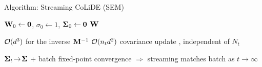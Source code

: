 \documentclass[9pt, aspectratio=169, xcolor=table]{beamer}
\begin{document}
\begin{frame}[shrink=15]{Algorithm: Streaming CoLiDE (SEM)}

	\begin{minipage}[t]{0.60\textwidth}
	{\small
	\begin{algorithm}[H]
	\DontPrintSemicolon
	\KwOut{$\widehat{\bbW}$}
	${\mathbf W}_0\gets{\ensuremath{\mathbf 0}}$, $\sigma_0\gets1$, $\boldsymbol{\Sigma}_0\gets{\ensuremath{\mathbf 0}}$\;
	\Return ${\mathbf W}$\;
	\end{algorithm}}
	\end{minipage}
	\hfill
	\begin{minipage}[t]{0.36\textwidth}
		\vpos
		\begin{myblock}
			\bi {}
			\ai ${\mathcal O}(d^3)$ for the inverse ${\mathbf M}^{-1}$
			\ai ${\mathcal O}(n_t d^2)$ covariance update
			\ai {}, independent of $N_t$\ei
		\end{myblock}
		\begin{myblock}
			\bi {} $\boldsymbol{\Sigma}_t\!\to\!\boldsymbol{\Sigma}$ + batch fixed-point convergence $\Rightarrow$ streaming matches batch as $t\!\to\!\infty$\ei
		\end{myblock}
	\end{minipage}

\end{frame}

\end{document}
